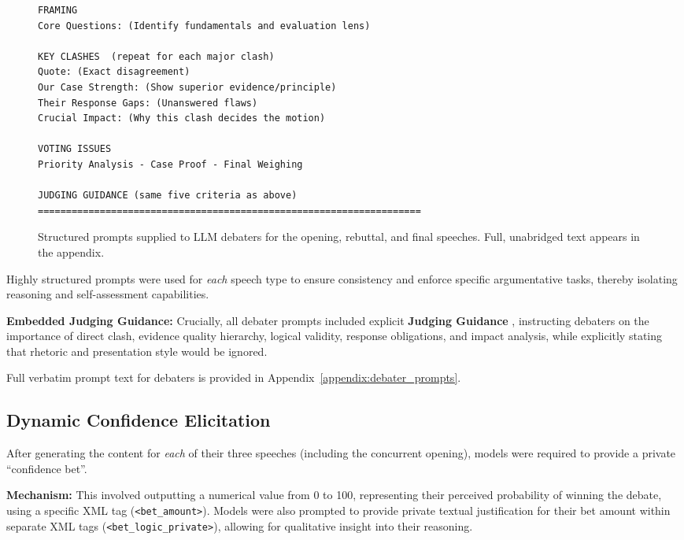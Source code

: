 \documentclass{article}
\begin{document}
\begin{figure}[htbp]
\begin{adjustbox}{max height=0.88\textheight}
\begin{lstlisting}[language={}]
FRAMING
Core Questions: (Identify fundamentals and evaluation lens)

KEY CLASHES  (repeat for each major clash)
Quote: (Exact disagreement)
Our Case Strength: (Show superior evidence/principle)
Their Response Gaps: (Unanswered flaws)
Crucial Impact: (Why this clash decides the motion)

VOTING ISSUES
Priority Analysis - Case Proof - Final Weighing

JUDGING GUIDANCE (same five criteria as above)
====================================================================
  \end{lstlisting}
  \end{adjustbox}

  \caption{Structured prompts supplied to LLM debaters for the opening, rebuttal,
  and final speeches.  Full, unabridged text appears in the appendix.}
  \label{fig:prompts}
\end{figure}


Highly structured prompts were used for \textit{each} speech type to ensure consistency and enforce specific argumentative tasks, thereby isolating reasoning and self-assessment capabilities.

\textbf{Embedded Judging Guidance:} Crucially, all debater prompts included explicit \textbf{Judging Guidance} , instructing debaters on the importance of direct clash, evidence quality hierarchy, logical validity, response obligations, and impact analysis, while explicitly stating that rhetoric and presentation style would be ignored.

Full verbatim prompt text for debaters is provided in Appendix~\ref{appendix:debater_prompts}.

\subsection{Dynamic Confidence Elicitation}
\label{subsec:confidence_elicitation}

After generating the content for \textit{each} of their three speeches (including the concurrent opening), models were required to provide a private ``confidence bet''.

\textbf{Mechanism:} This involved outputting a numerical value from 0 to 100, representing their perceived probability of winning the debate, using a specific XML tag (\texttt{\textless bet\_amount\textgreater}).
Models were also prompted to provide private textual justification for their bet amount within separate XML tags (\texttt{\textless bet\_logic\_private\textgreater}), allowing for qualitative insight into their reasoning.
\end{document}
